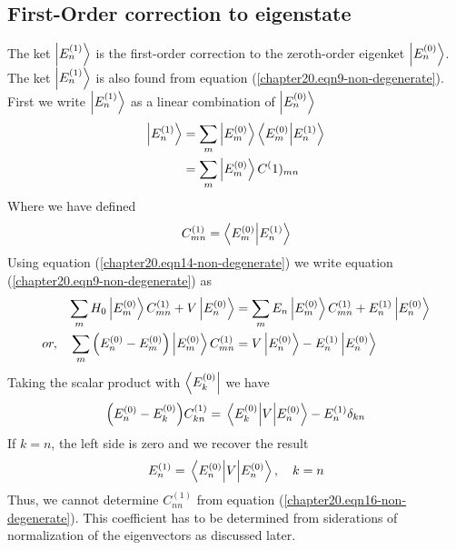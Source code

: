 \subsection{First-Order correction to eigenstate}
The ket $\ket{E_{n}^{(1)}}$ is the first-order correction to the zeroth-order eigenket $\ket{E_{n}^{(0)}}$. The ket $\ket{E_{n}^{(1)}}$ is also found from equation (\ref{chapter20.eqn9-non-degenerate}). First we write $\ket{E_{n}^{(1)}}$ as a linear combination of $\ket{E_{n}^{(0)}}$
\begin{align}
\label{chapter20.eqn13-non-degenerate}
\ket{E_{n}^{(1)}} 
&= \sum_{m} \ket{E_{m}^{(0)}} \braket{E_m^{(0)}}{E_n^{(1)}} \\
\label{chapter20.eqn14-non-degenerate}
&= \sum_{m} \ket{E_{m}^{(0)}} C^(1)_{m n}
\end{align}
Where we have defined
\begin{equation}
C^{(1)}_{m n} = \braket{E_m^{(0)}}{E_n^{(1)}}
\label{chapter20.eqn15-non-degenerate}
\end{equation}
Using equation (\ref{chapter20.eqn14-non-degenerate}) we write equation (\ref{chapter20.eqn9-non-degenerate}) as
\begin{align*}
	\sum_{m} H_0 \ket{E_{m}^{(0)}} C^{(1)}_{m n} + V \ket{E_{n}^{(0)}} 
	&= \sum_{m} E_n \ket{E_{m}^{(0)}} C^{(1)}_{m n} + E_{n}^{(1)} \ket{E_{n}^{(0)}} \\
	or, \quad 
	\sum_{m} \qty(E_{n}^{(0)}  -  E_{m}^{(0)}) \ket{E_{m}^{(0)}} C^{(1)}_{m n} 
	&= V \ket{E_n^{(0)}} - E_{n}^{(1)} \ket{E_{n}^{(0)}}
\end{align*}
Taking the scalar product with $\bra{E_k^{(0)}}$ we have
\begin{equation}
\qty(E_n^{(0)} - E_k^{(0)}) C^{(1)}_{k n} = \matrixel{E_k^{(0)}} {V} {E_n^{(0)}} - E_n^{(1)} \delta_{k n}
\label{chapter20.eqn16-non-degenerate}
\end{equation}
If $k=n$, the left side is zero and we recover the result
\begin{equation}
E_n^{(1)}  = \matrixel{E_n^{(0)}} {V} {E_n^{(0)}} , \quad k = n
\end{equation}
Thus, we cannot determine $C^{(1)}_{n n}$ from equation (\ref{chapter20.eqn16-non-degenerate}). This coefficient has to be determined from siderations of normalization of the eigenvectors as discussed later.


